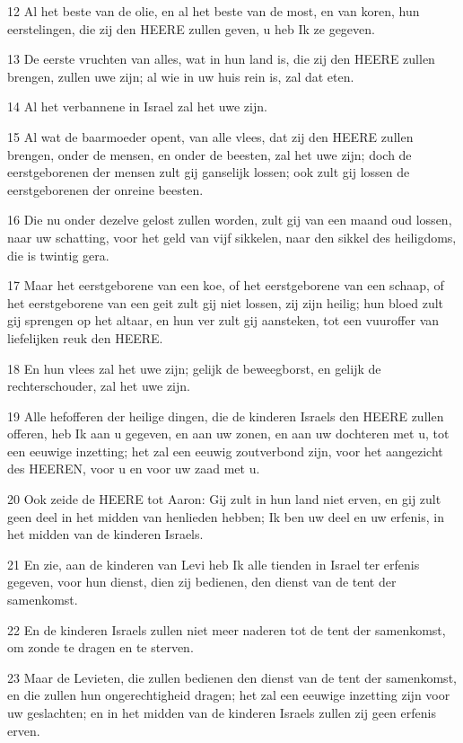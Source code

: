 \par 12 Al het beste van de olie, en al het beste van de most, en van koren, hun eerstelingen, die zij den HEERE zullen geven, u heb Ik ze gegeven.
\par 13 De eerste vruchten van alles, wat in hun land is, die zij den HEERE zullen brengen, zullen uwe zijn; al wie in uw huis rein is, zal dat eten.
\par 14 Al het verbannene in Israel zal het uwe zijn.
\par 15 Al wat de baarmoeder opent, van alle vlees, dat zij den HEERE zullen brengen, onder de mensen, en onder de beesten, zal het uwe zijn; doch de eerstgeborenen der mensen zult gij ganselijk lossen; ook zult gij lossen de eerstgeborenen der onreine beesten.
\par 16 Die nu onder dezelve gelost zullen worden, zult gij van een maand oud lossen, naar uw schatting, voor het geld van vijf sikkelen, naar den sikkel des heiligdoms, die is twintig gera.
\par 17 Maar het eerstgeborene van een koe, of het eerstgeborene van een schaap, of het eerstgeborene van een geit zult gij niet lossen, zij zijn heilig; hun bloed zult gij sprengen op het altaar, en hun ver zult gij aansteken, tot een vuuroffer van liefelijken reuk den HEERE.
\par 18 En hun vlees zal het uwe zijn; gelijk de beweegborst, en gelijk de rechterschouder, zal het uwe zijn.
\par 19 Alle hefofferen der heilige dingen, die de kinderen Israels den HEERE zullen offeren, heb Ik aan u gegeven, en aan uw zonen, en aan uw dochteren met u, tot een eeuwige inzetting; het zal een eeuwig zoutverbond zijn, voor het aangezicht des HEEREN, voor u en voor uw zaad met u.
\par 20 Ook zeide de HEERE tot Aaron: Gij zult in hun land niet erven, en gij zult geen deel in het midden van henlieden hebben; Ik ben uw deel en uw erfenis, in het midden van de kinderen Israels.
\par 21 En zie, aan de kinderen van Levi heb Ik alle tienden in Israel ter erfenis gegeven, voor hun dienst, dien zij bedienen, den dienst van de tent der samenkomst.
\par 22 En de kinderen Israels zullen niet meer naderen tot de tent der samenkomst, om zonde te dragen en te sterven.
\par 23 Maar de Levieten, die zullen bedienen den dienst van de tent der samenkomst, en die zullen hun ongerechtigheid dragen; het zal een eeuwige inzetting zijn voor uw geslachten; en in het midden van de kinderen Israels zullen zij geen erfenis erven.

